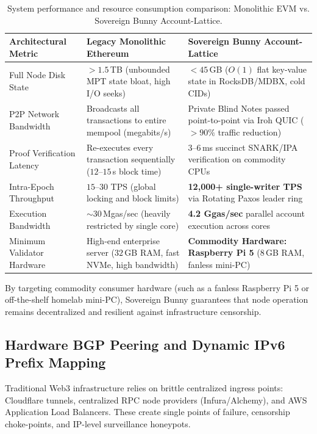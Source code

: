 \documentclass[a4paper,11pt,twoside,parskip=half-,headings=small]{scrartcl}
\begin{document}
\begin{table}[H]
\centering\small
\renewcommand{\arraystretch}{1.25}
\begin{tabularx}{\linewidth}{@{}L{3.4cm} L{4.6cm} Y@{}}
\toprule
\textbf{Architectural Metric} & \textbf{Legacy Monolithic Ethereum} & \textbf{Sovereign Bunny Account-Lattice}\\
\midrule
Full Node Disk State & $> 1.5$\,TB (unbounded MPT state bloat, high I/O seeks) & $< 45$\,GB ($O(1)$ flat key-value state in RocksDB/MDBX, cold CIDs)\\
P2P Network Bandwidth & Broadcasts all transactions to entire mempool (megabits/s) & Private Blind Notes passed point-to-point via Iroh QUIC ($> 90\%$ traffic reduction)\\
Proof Verification Latency & Re-executes every transaction sequentially ($12$--$15$\,s block time) & $3$--$6$\,ms succinct SNARK/IPA verification on commodity CPUs\\
Intra-Epoch Throughput & $15$--$30$ TPS (global locking and block limits) & \textbf{12,000+ single-writer TPS} via Rotating Paxos leader ring\\
Execution Bandwidth & $\sim 30$\,Mgas/sec (heavily restricted by single core) & \textbf{4.2 Ggas/sec} parallel account execution across cores\\
Minimum Validator Hardware & High-end enterprise server ($32$\,GB RAM, fast NVMe, high bandwidth) & \textbf{Commodity Hardware: Raspberry Pi 5} ($8$\,GB RAM, fanless mini-PC)\\
\bottomrule
\end{tabularx}
\caption{System performance and resource consumption comparison: Monolithic EVM vs. Sovereign Bunny Account-Lattice.}
\label{tab:performance_comparison}
\end{table}

By targeting commodity consumer hardware (such as a fanless Raspberry Pi 5 or off-the-shelf homelab mini-PC),
Sovereign Bunny guarantees that node operation remains decentralized and resilient against infrastructure censorship.

\subsection{Hardware BGP Peering and Dynamic IPv6 Prefix Mapping}
\label{sec:bgp_peering}

Traditional Web3 infrastructure relies on brittle centralized ingress points: Cloudflare tunnels, centralized RPC node providers (Infura/Alchemy), and AWS Application Load Balancers. These create single points of failure, censorship choke-points, and IP-level surveillance honeypots.
\end{document}
